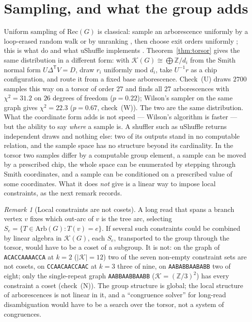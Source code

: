 \documentclass[11pt]{article}
\theoremstyle{plain}
\theoremstyle{definition}
\theoremstyle{remark}
\newtheorem{remark}[theorem]{Remark}
\newcommand{\Z}{\mathbb{Z}}
\newcommand{\K}{\mathcal{K}}
\newcommand{\Arb}{\mathrm{Arb}}
\newcommand{\Rec}{\mathrm{Rec}}
\begin{document}
\section{Sampling, and what the group adds}\label{sec:sampling}

Uniform sampling of $\Rec(G)$ is classical: sample an arborescence uniformly by a
loop-erased random walk \cite{Wilson,PW} or by unranking \cite{CMN}, then choose exit
orders uniformly \cite{CC}; this is what \cite{AE,KMUW} do and what uShuffle implements
\cite{uShuffle}. Theorem~\ref{thm:torsor} gives the same distribution in a different form:
with $\K(G)\cong\bigoplus\Z/d_i$ from the Smith normal form $U\Delta^{\mathsf T}V=D$, draw
$r_i$ uniformly mod $d_i$, take $U^{-1}r$ as a chip configuration, and route it from a
fixed base arborescence. Check~(U) draws $2700$ samples this way on a torsor of order $27$
and finds all $27$ arborescences with $\chi^{2}=31.2$ on $26$ degrees of freedom
($p=0.22$); Wilson's sampler on the same graph gives $\chi^{2}=22.3$ ($p=0.67$,
check~(W)). The two are the same
distribution. What the coordinate form adds is not speed --- Wilson's algorithm is faster
--- but the ability to say \emph{where} a sample is. A shuffler such as uShuffle returns
independent draws and nothing else: two of its outputs stand in no computable relation,
and the sample space has no structure beyond its cardinality. In the torsor two samples
differ by a computable group element, a sample can be moved by a prescribed chip, the
whole space can be enumerated by stepping through Smith coordinates, and a sample can be
conditioned on a prescribed value of some coordinates. What it does \emph{not} give is a
linear way to impose local constraints, as the next remark records.

\begin{remark}[Local constraints are not cosets]\label{rem:cosets}
A long read that spans a branch vertex $v$ fixes which out-arc of $v$ is the tree arc,
selecting $S_{e}=\{T\in\Arb(G):T(v)=e\}$. If several such constraints could be combined
by linear algebra in $\K(G)$, each $S_e$, transported to the group through the torsor,
would have to be a coset of a subgroup. It is not: on the graph of \texttt{ACACCAAAACCA}
at $k=2$ ($|\K|=12$) two of the seven non-empty constraint sets are not cosets, on
\texttt{CCAACAACCAAC} at $k=3$ three of nine, on \texttt{AABABBAABABB} two of eight;
only the single-repeat graph \texttt{AABBAABBAABB} ($\K=(\Z/3)^{2}$) has every
constraint a coset (check~(N)). The group structure is global; the local structure of
arborescences is not linear in it, and a ``congruence solver'' for long-read
disambiguation would have to be a search over the torsor, not a system of congruences.
\end{remark}
\end{document}
